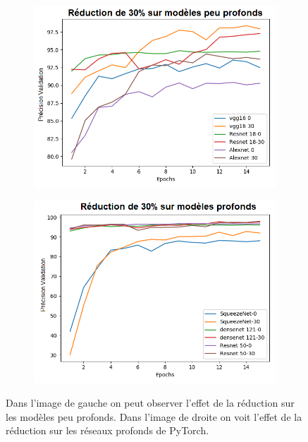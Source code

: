 \documentclass[12pt]{article}
\begin{document}
\begin{figure}[H]
	\centering
	\begin{subfigure}[b]{0.5\textwidth}            
		\includegraphics[width=\textwidth]{fig/various_models_shallow_fr}
		\label{fig:SRl}
	\end{subfigure}%
	\begin{subfigure}[b]{0.5\textwidth}
		\centering
		\includegraphics[width=\textwidth]{fig/various_models_deep_fr}
		\label{fig:D-Imager}
	\end{subfigure}
	\caption{Dans l'image de gauche on peut observer l'effet de la réduction sur les modèles peu profonds. Dans l'image de droite on voit l'effet de la réduction sur les réseaux profonds de PyTorch.}
\end{figure}
\end{document}
